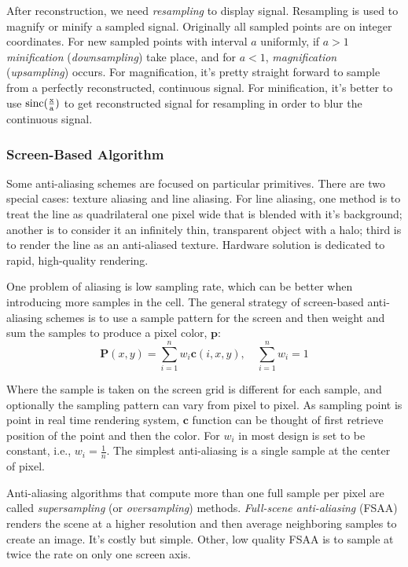 \documentclass[10pt, a4paper]{article}
\begin{document}
            After reconstruction, we need \emph{resampling} to display signal. Resampling is used to magnify or minify a sampled signal. Originally all sampled points are on integer coordinates. For new sampled points with interval $a$ uniformly, if $a > 1$ \emph{minification} (\emph{downsampling}) take place, and for $a < 1$, \emph{magnification} (\emph{upsampling}) occurs. For magnification, it's pretty straight forward to sample from a perfectly reconstructed, continuous signal. For minification, it's better to use $\rm{sinc}(\frac{x}{a})$ to get reconstructed signal for resampling in order to blur the continuous signal.

            \subsubsection{Screen-Based Algorithm}
                Some anti-aliasing schemes are focused on particular primitives. There are two special cases: texture aliasing and line aliasing. For line aliasing, one method is to treat the line as quadrilateral one pixel wide that is blended with it's background; another is to consider it an infinitely thin, transparent object with a halo; third is to render the line as an anti-aliased texture. Hardware solution is dedicated to rapid, high-quality rendering. 

                One problem of aliasing is low sampling rate, which can be better when introducing more samples in the cell. The general strategy of screen-based anti-aliasing schemes is to use a sample pattern for the screen and then weight and sum the samples to produce a pixel color, $\textbf{p}$: 
                    $$\textbf{P}(x, y) = \sum_{i = 1}^nw_i\textbf{c}(i,x,y),\quad \sum_{i = 1}^nw_i = 1$$
                
                    Where the sample is taken on the screen grid is different for each sample, and optionally the sampling pattern can vary from pixel to pixel. As sampling point is point in real time rendering system, $\textbf{c}$ function can be thought of first retrieve position of the point and then the color. For $w_i$ in most design is set to be constant, i.e., $w_i = \frac{1}{n}$. The simplest anti-aliasing is a single sample at the center of pixel. 

                    Anti-aliasing algorithms that compute more than one full sample per pixel are called \emph{supersampling} (or \emph{oversampling}) methods. \emph{Full-scene anti-aliasing} (FSAA) renders the scene at a higher resolution and then average neighboring samples to create an image. It's costly but simple. Other, low quality FSAA is to sample at twice the rate on only one screen axis. 
\end{document}
